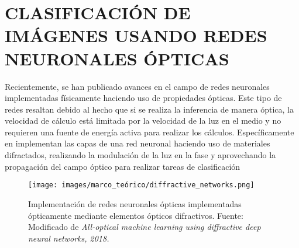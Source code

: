 \section{CLASIFICACIÓN DE IMÁGENES USANDO REDES NEURONALES ÓPTICAS}


Recientemente, se han publicado avances en el campo de redes neuronales implementadas físicamente haciendo uso de propiedades ópticas. Este tipo de redes resaltan debido al hecho que si se realiza la inferencia de manera óptica, la velocidad de cálculo está limitada por la velocidad de la luz en el medio y no requieren una fuente de energía activa para realizar los cálculos. Específicamente en  implementan las capas de una red neuronal haciendo uso de materiales difractados, realizando la modulación de la luz en la fase y aprovechando la propagación del campo óptico para realizar tareas de clasificación


\begin{figure}[!h]
    \centering
    \texttt{[image: images/marco\_teórico/diffractive\_networks.png]}
    \caption{Implementación de redes neuronales ópticas implementadas ópticamente mediante elementos ópticos difractivos. Fuente: Modificado de \textit{All-optical machine learning using diffractive deep neural networks, 2018.}}
    \label{fig:optical_networks}
\end{figure}

